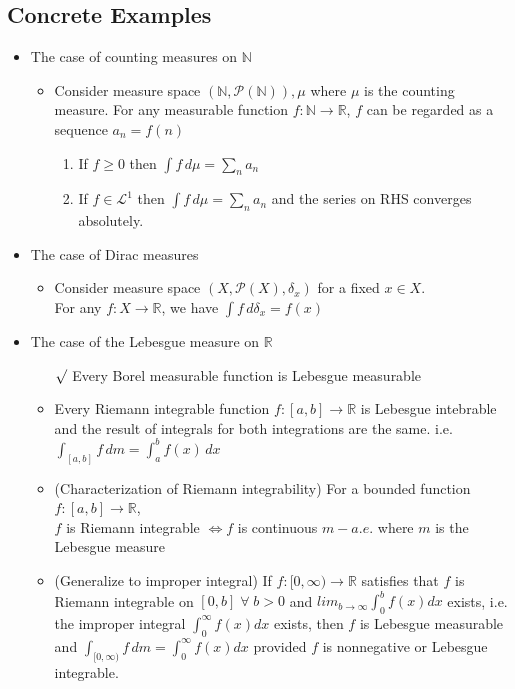 \documentclass[12pt]{article}
\newcommand{\rmk}{$\surd$}
\newcommand{\N}{\mathbb{N}}
\newcommand{\R}{\mathbb{R}}
\newcommand{\LL}{\mathcal{L}}
\newcommand{\forany}{\; \forall \;}
\begin{document}
\subsection{Concrete Examples}
\smallskip
\begin{itemize}
    \item The case of counting measures on $\N$
    \begin{itemize}
        \item Consider measure space $(\N, \mathcal{P}(\N)),\mu$ where $\mu$ is the counting measure. For any measurable function $f:\N \rightarrow \R$, $f$ can be regarded as a sequence $a_n=f(n)$
        \begin{enumerate}
            \item If $f\geq 0$ then $\int f \, d\mu=\sum_n a_n$
            \item If $f\in\LL^1$ then $\int f\, d\mu=\sum_n a_n$ and the series on RHS converges absolutely.
        \end{enumerate} 
    \end{itemize}
    \item The case of Dirac measures
    \begin{itemize}
        \item Consider measure space $(X, \mathcal{P}(X), \delta_x)$ for a fixed $x\in X$. \\For any $f:X\rightarrow \R$, we have $\int f\, d\delta_x=f(x)$
    \end{itemize}
    \item The case of the Lebesgue measure on $\R$
    \begin{itemize}
        \item[\rmk] Every Borel measurable function is Lebesgue measurable
        \item Every Riemann integrable function $f:[a,b]\rightarrow \R$ is Lebesgue intebrable and the result of integrals for both integrations are the same. i.e. $\int_{[a,b]}f \, dm=\int_a^b f(x)\, dx$
        \item (Characterization of Riemann integrability) For a bounded function $f: [a,b]\rightarrow \R$, \\ $f$ is Riemann integrable $\Leftrightarrow f$ is continuous $m-a.e.$ where $m$ is the Lebesgue measure
        \item (Generalize to improper integral) If $f:[0,\infty)\rightarrow \R$ satisfies that $f$ is Riemann integrable on $[0,b]\forany b>0$ and $lim_{b \to \infty}\int_0^b f(x)dx$ exists, i.e. the improper integral $\int_0^\infty f(x)dx$ exists, then $f$ is Lebesgue measurable and $\int_{[0,\infty)} f\, dm=\int_0^\infty f(x)dx$ provided $f$ is nonnegative or Lebesgue integrable. 

\end{itemize}
\end{itemize}
\end{document}
